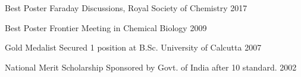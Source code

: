 

\begin{cvhonors}


\cvhonor
{Best Poster} %
{Faraday Discussions, Royal Society of Chemistry} %
{} %
{2017} %


\cvhonor
{Best Poster} %
{Frontier Meeting in Chemical Biology} %
{} %
{2009} %


\cvhonor
{Gold Medalist} %
{Secured 1 position at B.Sc. University of Calcutta} %
{} %
{2007} %


\cvhonor
{National Merit Scholarship} %
{Sponsored by Govt. of India after 10 standard.} %
{} %
{2002} %


\end{cvhonors}
